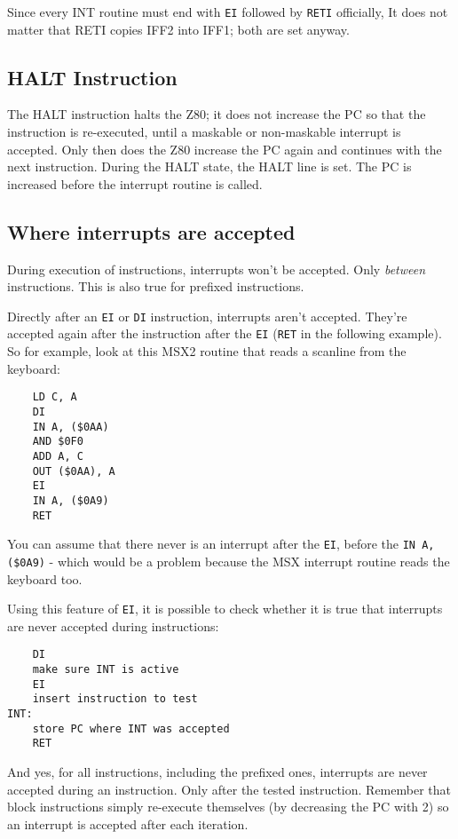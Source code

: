 \documentclass[12pt,twoside,openright,a4paper]{book}
\begin{document}
Since every INT routine must end with {\tt EI} followed by {\tt RETI} officially, It does not matter that RETI copies IFF2 into IFF1; both are set anyway.


\subsection{HALT Instruction}

The HALT instruction halts the Z80; it does not increase the PC so that the instruction is re-executed, until a maskable or non-maskable interrupt is accepted. Only then does the Z80 increase the PC again and continues with the next instruction. During the HALT state, the HALT line is set. The PC is increased before the interrupt routine is called.


\subsection{Where interrupts are accepted}

During execution of instructions, interrupts won't be accepted. Only {\em between} instructions. This is also true for prefixed instructions.

Directly after an {\tt EI} or {\tt DI} instruction, interrupts aren't accepted. They're accepted again after the instruction after the {\tt EI} ({\tt RET} in the following example). So for example, look at this MSX2 routine that reads a scanline from the keyboard:

\begin{Verbatim}
	LD C, A
	DI
	IN A, ($0AA)
	AND $0F0
	ADD A, C
	OUT ($0AA), A
	EI
	IN A, ($0A9)
	RET
\end{Verbatim}

You can assume that there never is an interrupt after the {\tt EI}, before the {\tt IN A,(\$0A9)} - which would be a problem because the MSX interrupt routine reads the keyboard too.

Using this feature of {\tt EI}, it is possible to check whether it is true that interrupts are never accepted during instructions:

\begin{Verbatim}
	DI
	make sure INT is active
	EI
	insert instruction to test
INT:
	store PC where INT was accepted
	RET
\end{Verbatim}

And yes, for all instructions, including the prefixed ones, interrupts are never accepted during an instruction. Only after the tested instruction. Remember that block instructions simply re-execute themselves (by decreasing the PC with 2) so an interrupt is accepted after each iteration.
\end{document}
